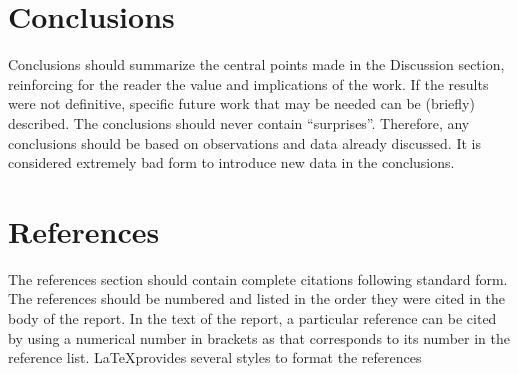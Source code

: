 \section{Conclusions}
Conclusions should summarize the central points made in the Discussion section, reinforcing for the reader the value and implications of the work. If the results were not definitive, specific future work that may be needed can be (briefly) described. The conclusions should never contain ``surprises''. Therefore, any conclusions should be based on observations and data already discussed. It is considered extremely bad form to introduce new data in the conclusions.

\section*{References}

The references section should contain complete citations following standard form.  The references should be numbered and listed in the order they were cited in the body of the report. In the text of the report, a particular reference can be cited by using a numerical number in brackets as \cite{Lee2015} that corresponds to its number in the reference list. \LaTeX provides several styles to format the references





